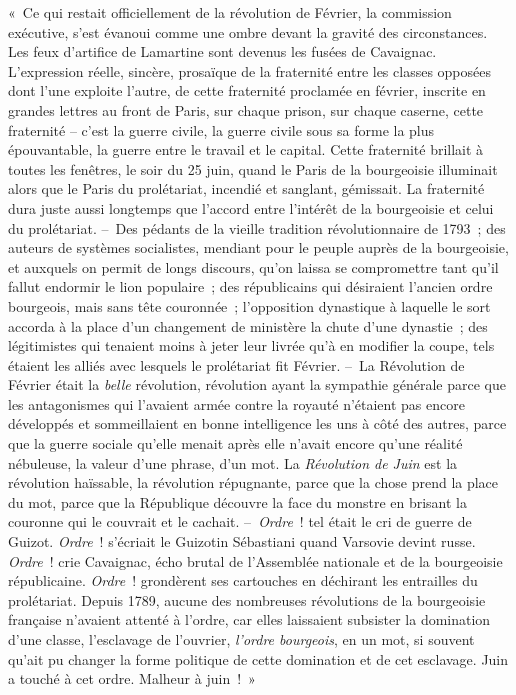 \documentclass[twoside]{book} %
\begin{document}
« Ce qui restait officiellement de la révolution de Février, la commission exécutive, s’est évanoui comme une ombre devant la gravité des circonstances. Les feux d’artifice de Lamartine sont devenus les fusées de Cavaignac. L’expression réelle, sincère, prosaïque de la fraternité entre les classes opposées dont l’une exploite l’autre, de cette fraternité proclamée en février, inscrite en grandes lettres au front de Paris, sur chaque prison, sur chaque caserne, cette fraternité – c’est la guerre civile, la guerre civile sous sa forme la plus épouvantable, la guerre entre le travail et le capital. Cette fraternité brillait à toutes les fenêtres, le soir du 25 juin, quand le Paris de la bourgeoisie illuminait alors que le Paris du prolétariat, incendié et sanglant, gémissait. La fraternité dura juste aussi longtemps que l’accord entre l’intérêt de la bourgeoisie et celui du prolétariat. – Des pédants de la vieille tradition révolutionnaire de 1793 ; des auteurs de systèmes socialistes, mendiant pour le peuple auprès de la bourgeoisie, et auxquels on permit de longs discours, qu’on laissa se compromettre tant qu’il fallut endormir le lion populaire ; des républicains qui désiraient l’ancien ordre bourgeois, mais sans tête couronnée ; l’opposition dynastique à laquelle le sort accorda à la place d’un changement de ministère la chute d’une dynastie ; des légitimistes qui tenaient moins à jeter leur livrée qu’à en modifier la coupe, tels étaient les alliés avec lesquels le prolétariat fit Février. – La Révolution de Février était la \emph{belle} révolution, révolution ayant la sympathie générale parce que les antagonismes qui l’avaient armée contre la royauté n’étaient pas encore développés et sommeillaient en bonne intelligence les uns à côté des autres, parce que la guerre sociale qu’elle menait après elle n’avait encore qu’une réalité nébuleuse, la valeur d’une phrase, d’un mot. La \emph{Révolution de Juin} est la révolution haïssable, la révolution répugnante, parce que la chose prend la place du mot, parce que la République découvre la face du monstre en brisant la couronne qui le couvrait et le cachait. – \emph{Ordre} ! tel était le cri de guerre de Guizot. \emph{Ordre} ! s’écriait le Guizotin Sébastiani quand Varsovie devint russe. \emph{Ordre} ! crie Cavaignac, écho brutal de l’Assemblée nationale et de la bourgeoisie républicaine. \emph{Ordre} ! grondèrent ses cartouches en déchirant les entrailles du prolétariat. Depuis 1789, aucune des nombreuses révolutions de la bourgeoisie française n’avaient attenté à l’ordre, car elles laissaient subsister la domination d’une classe, l’esclavage de l’ouvrier, \emph{l’ordre bourgeois}, en un mot, si souvent qu’ait pu changer la forme politique de cette domination et de cet esclavage. Juin a touché à cet ordre. Malheur à juin ! »\par
\end{document}
